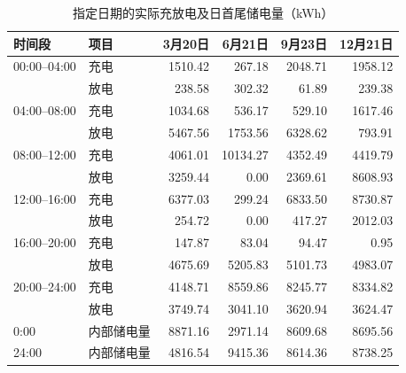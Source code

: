 \begin{table}[H]
\centering
\caption{指定日期的实际充放电及日首尾储电量（kWh）}
\label{tab:q3_storage}
\small
\setlength{\tabcolsep}{5pt}
\begin{tabular}{llrrrr}
\toprule
时间段 & 项目 & 3月20日 & 6月21日 & 9月23日 & 12月21日 \\
\midrule
00:00--04:00 & 充电 & 1510.42 & 267.18 & 2048.71 & 1958.12 \\
 & 放电 & 238.58 & 302.32 & 61.89 & 239.38 \\
04:00--08:00 & 充电 & 1034.68 & 536.17 & 529.10 & 1617.46 \\
 & 放电 & 5467.56 & 1753.56 & 6328.62 & 793.91 \\
08:00--12:00 & 充电 & 4061.01 & 10134.27 & 4352.49 & 4419.79 \\
 & 放电 & 3259.44 & 0.00 & 2369.61 & 8608.93 \\
12:00--16:00 & 充电 & 6377.03 & 299.24 & 6833.50 & 8730.87 \\
 & 放电 & 254.72 & 0.00 & 417.27 & 2012.03 \\
16:00--20:00 & 充电 & 147.87 & 83.04 & 94.47 & 0.95 \\
 & 放电 & 4675.69 & 5205.83 & 5101.73 & 4983.07 \\
20:00--24:00 & 充电 & 4148.71 & 8559.86 & 8245.77 & 8334.82 \\
 & 放电 & 3749.74 & 3041.10 & 3620.94 & 3624.47 \\
\midrule
0:00 & 内部储电量 & 8871.16 & 2971.14 & 8609.68 & 8695.56 \\
24:00 & 内部储电量 & 4816.54 & 9415.36 & 8614.36 & 8738.25 \\
\bottomrule
\end{tabular}
\end{table}
